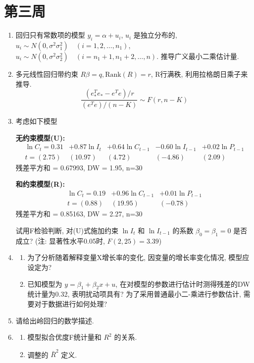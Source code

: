 \section{第三周}
\begin{enumerate}

\item 回归只有常数项的模型 $y_{i}=\alpha+u_{i}$, $u_{i}$ 是独立分布的,
$u_{i}\sim N(0,\sigma^{2}\sigma_{1}^{2}) \quad (i=1,2,\dots,n_{1})$, 
$u_{i}\sim N(0,\sigma^{2}\sigma_{2}^{2}) \quad (i=n_{1}+1,n_{1}+2,\dots,n)$.
推导广义最小二乘估计量.

\item 多元线性回归带约束 $R\beta=q, \text{Rank}(R)=r$, R行满秩, 利用拉格朗日乘子来推导.
\[
\frac{(e_{*}^{T}e_{*} - e^{T}e)/r}{(e^{T}e)/(n-K)} \sim F(r,n-K)
\]
\item 考虑如下模型\par
\textbf{无约束模型(U):}
\begin{align*}
    \ln C_t = 0.31 &+ 0.87 \ln I_t &+ 0.64 \ln C_{t-1} &- 0.60 \ln I_{t-1} &+ 0.02 \ln P_{t-1} \\
    t = (2.75) & (10.97) & (4.72) & (-4.86) & (2.09)
\end{align*}
残差平方和 = 0.67993, \quad DW = 1.95, \quad n=30

\textbf{和约束模型(R):}
\begin{align*}
    \ln C_{t} = 0.19 &+ 0.96 \ln C_{t-1} &+ 0.01 \ln P_{t-1} \\
    t = (0.88) & (19.95) & (-0.78)
\end{align*}
残差平方和 = 0.85163, \quad DW = 2.27, \quad n=30

试用F检验判断, 对(U)式施加约束 $\ln I_t$ 和 $\ln I_{t-1}$ 的系数 $\beta_{0}=\beta_{1}=0$ 是否成立? (注: 显著性水平0.05时, $F(2,25)=3.39$)

\item 
\begin{enumerate}
    \item[(1)] 为了分析随着解释变量X增长率的变化, 因变量的增长率变化情况, 模型应设定为?
    \item[(2)] 已知模型为 $y=\beta_{1}+\beta_{2}x+u$, 在对模型的参数进行估计时测得残差的DW统计量为0.32, 表明扰动项具有? 为了采用普通最小二-乘进行参数估计, 需要对于数据进行如何处理?
\end{enumerate}

\item 请给出岭回归的数学描述.

\item 
\begin{enumerate}
    \item[(1)] 模型拟合优度F统计量和 $R^{2}$ 的关系.
    \item[(2)] 调整的 $\bar{R}^{2}$ 定义.
\end{enumerate}


\end{enumerate}
